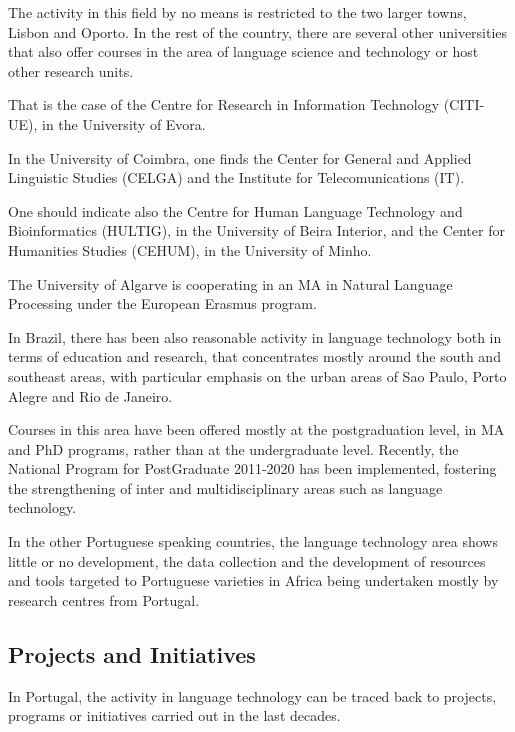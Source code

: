 \begin{multicols}{2}
The activity in this field by no means is restricted to the two larger towns, Lisbon and Oporto.
In the rest of the country, there are several other universities that also offer courses in the area of language 
science and technology or host other research units.

That is the case of the Centre for Research in Information Technology (CITI-UE), in the University of Evora.

In the University of Coimbra, one finds the Center for General and Applied Linguistic Studies (CELGA)
and the Institute for Telecomunications (IT).

One should indicate also the Centre for Human Language Technology and Bioinformatics (HULTIG), in the University of Beira Interior,
and the Center for Humanities Studies (CEHUM), in the University of Minho. 

The University of Algarve is cooperating in an MA in Natural Language Processing under the European Erasmus program.


In Brazil, there has been also reasonable activity in language technology both in terms of education and research, 
that concentrates mostly around  the south and southeast areas,
with particular emphasis on the urban areas of Sao Paulo, Porto Alegre and Rio de Janeiro. 

Courses in this area have been offered mostly at the postgraduation level, in MA and PhD programs, rather than at the undergraduate level. 
Recently, the National Program for PostGraduate 2011-2020 has been implemented, fostering the strengthening of inter and multidisciplinary 
areas such as language technology.

In the other Portuguese speaking countries, the language technology area shows little or no development, 
the data collection and the development of resources and tools targeted to Portuguese varieties in Africa being undertaken 
mostly by research centres from Portugal.

\subsection{Projects and Initiatives}

 In Portugal, the activity in language technology can be traced back to projects, programs or initiatives carried out in the last decades. 


\end{multicols}
